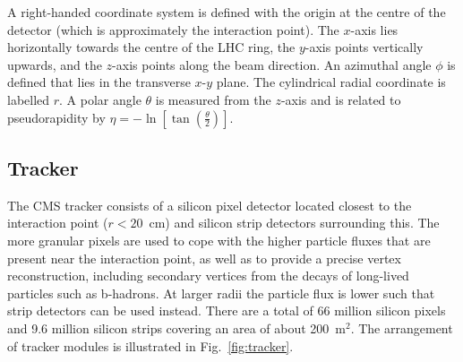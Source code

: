 A right-handed coordinate system is defined with the origin at the centre of 
the detector (which is approximately the interaction point). The $x$-axis lies 
horizontally towards the centre of the LHC ring, the 
$y$-axis points vertically upwards, and the $z$-axis points along the beam 
direction. An azimuthal angle $\phi$ is defined that lies in the transverse 
$x$-$y$ plane. The cylindrical radial coordinate is labelled $r$. A polar angle 
$\theta$ is measured from the $z$-axis and is related to 
pseudorapidity by $\eta = -\ln\left[\tan\left(\frac{\theta}{2}\right)\right]$.

\subsection{Tracker}
The CMS tracker consists of a silicon pixel detector located closest to the 
interaction point ($r<20$~cm) and silicon strip detectors surrounding this. 
The more granular pixels are used to cope with the higher particle fluxes that 
are present near the interaction point, as well as to provide a precise vertex 
reconstruction, including secondary vertices from the decays of long-lived 
particles such as b-hadrons. At larger radii the particle flux is lower such 
that strip detectors can be used instead. There are a total of 66 million 
silicon pixels and 9.6 million silicon strips covering an area of about 
200~m$^2$. The arrangement of tracker modules is illustrated in 
Fig.~\ref{fig:tracker}.

